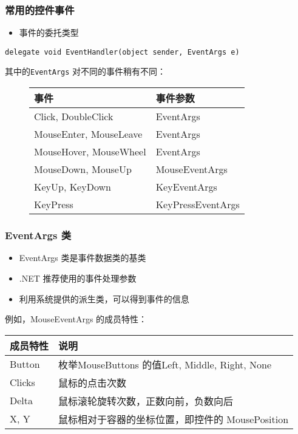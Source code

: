 \begin{frame}[fragile]
\frametitle{常用的控件事件}
\begin{itemize}
\item 事件的委托类型
\end{itemize}
\begin{lstlisting}
delegate void EventHandler(object sender, EventArgs e)
\end{lstlisting}
其中的\texttt{EventArgs} 对不同的事件稍有不同：
\begin{figure}[htbp]
  \centering
  \begin{tabular}{l|l}
    \hline
    事件                   & 事件参数          \\
    \hline
    Click, DoubleClick     & EventArgs         \\
    MouseEnter, MouseLeave & EventArgs         \\
    MouseHover, MouseWheel & EventArgs         \\
    MouseDown, MouseUp     & MouseEventArgs    \\
    KeyUp, KeyDown         & KeyEventArgs      \\
    KeyPress               & KeyPressEventArgs \\
    \hline
  \end{tabular}
\end{figure}
\end{frame}

\begin{frame}
\frametitle{EventArgs 类}
\begin{itemize}
\item EventArgs 类是事件数据类的基类
\item .NET 推荐使用的事件处理参数
\item 利用系统提供的派生类，可以得到事件的信息
\end{itemize}
\medskip

例如，MouseEventArgs 的成员特性：

\begin{tabular}{l|l}
\hline
成员特性 & 说明                                             \\  
\hline
Button   & 枚举MouseButtons 的值Left, Middle, Right, None \\
Clicks   & 鼠标的点击次数                                   \\
Delta    & 鼠标滚轮旋转次数，正数向前，负数向后             \\
X, Y     & 鼠标相对于容器的坐标位置，即控件的 MousePosition \\
\hline
\end{tabular}
\end{frame}

